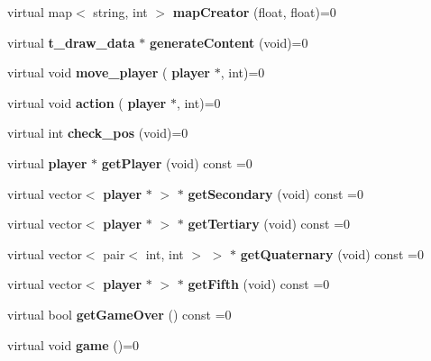 \begin{DoxyCompactItemize}
\item 
\mbox{\label{class_i_load_game_a7b0ecdf2435afe4393ee2eda80e041b1}} 
virtual map$<$ string, int $>$ {\bfseries map\+Creator} (float, float)=0
\item 
\mbox{\label{class_i_load_game_a90e4280011e2355cf9bc4b056aac5afd}} 
virtual \textbf{ t\+\_\+draw\+\_\+data} $\ast$ {\bfseries generate\+Content} (void)=0
\item 
\mbox{\label{class_i_load_game_aa3a2a3d662df1b77f9bbba71ec4f6473}} 
virtual void {\bfseries move\+\_\+player} (\textbf{ player} $\ast$, int)=0
\item 
\mbox{\label{class_i_load_game_a6ecb2016de0b1184ab8d289994fca9a1}} 
virtual void {\bfseries action} (\textbf{ player} $\ast$, int)=0
\item 
\mbox{\label{class_i_load_game_ae394034ebc67308547b8eded51dd4224}} 
virtual int {\bfseries check\+\_\+pos} (void)=0
\item 
\mbox{\label{class_i_load_game_a1b1c75a94ed268bd46034ea92696e40b}} 
virtual \textbf{ player} $\ast$ {\bfseries get\+Player} (void) const =0
\item 
\mbox{\label{class_i_load_game_add53f0396106e6a3ea39f11b0f165aa0}} 
virtual vector$<$ \textbf{ player} $\ast$ $>$ $\ast$ {\bfseries get\+Secondary} (void) const =0
\item 
\mbox{\label{class_i_load_game_a7bf04b5bbf70db852696df005ec70882}} 
virtual vector$<$ \textbf{ player} $\ast$ $>$ $\ast$ {\bfseries get\+Tertiary} (void) const =0
\item 
\mbox{\label{class_i_load_game_a28a272dbda6b0dbc21c704af561016f2}} 
virtual vector$<$ pair$<$ int, int $>$ $>$ $\ast$ {\bfseries get\+Quaternary} (void) const =0
\item 
\mbox{\label{class_i_load_game_a6cd96e642d48d7916c3c378438070ac4}} 
virtual vector$<$ \textbf{ player} $\ast$ $>$ $\ast$ {\bfseries get\+Fifth} (void) const =0
\item 
\mbox{\label{class_i_load_game_afc39bc729987f1d801617bc4486e77c3}} 
virtual bool {\bfseries get\+Game\+Over} () const =0
\item 
\mbox{\label{class_i_load_game_ad4147480ea7dcebdc71869a83d77a921}} 
virtual void {\bfseries game} ()=0
\end{DoxyCompactItemize}
